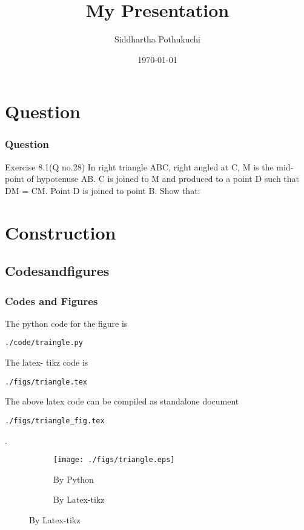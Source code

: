 \documentclass{beamer}
\title{My Presentation}
\author{Siddhartha Pothukuchi}
\institute{Indian Institute of Technology, Bhilai.}
\date{\today}
\begin{document}
\begin{frame}
\titlepage
\end{frame}
\section{Question}
\begin{frame}
\frametitle{Question}
\begin{block}{Exercise 8.1(Q no.28)}
In right triangle ABC, right angled at C, M is
the mid-point of hypotenuse AB. C is joined to
M and produced to a point D such that DM =
CM. Point D is joined to point B. Show that:
\newline
\hyperlink{a}{}
\newline
\hyperlink{b}{}
\newline
\hyperlink{c}{}
\newline
\hyperlink{d}{}

\end{block}
\end{frame}

\section{\textbf{Construction}}
\subsection*{Codesandfigures}
\begin{frame}[fragile]
\frametitle{Codes and Figures}
\tiny
\begin{flushleft}
The python code for the figure is
\begin{lstlisting}
./code/traingle.py
\end{lstlisting}
The latex- tikz code is
\begin{lstlisting}
./figs/triangle.tex
\end{lstlisting}
The above latex code can be compiled as standalone document
\begin{lstlisting} 
./figs/triangle_fig.tex
\end{lstlisting}
\end{flushleft}.
\begin{figure}
\begin{flushleft}
\begin{subfigure}{0.2\textwidth}
\texttt{[image: ./figs/triangle.eps]}
\caption{\tiny By Python}
\end{subfigure}
%
\begin{subfigure}{0.65\textwidth}
\begin{flushright}

\caption{\tiny By Latex-tikz}
\end{flushright}
\end{subfigure}
\end{flushleft}
%
\end{figure}
\end{frame}
\end{document}

